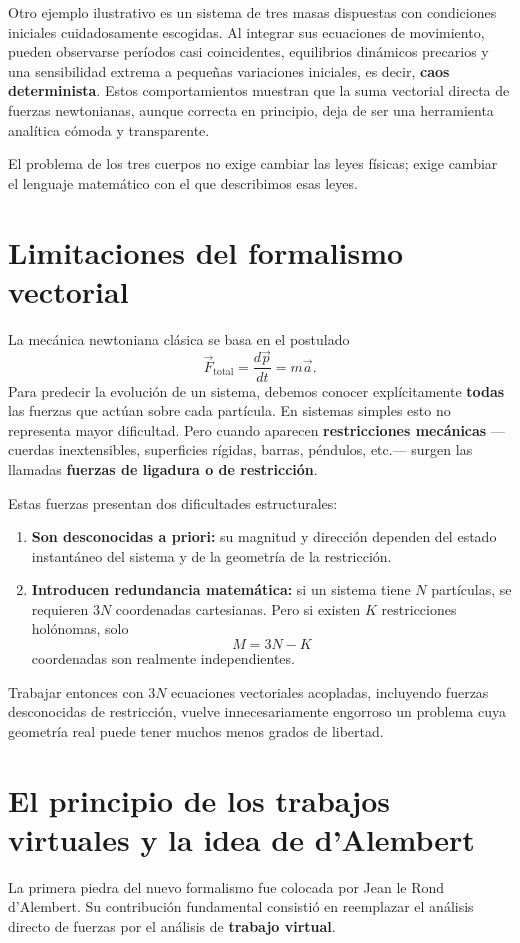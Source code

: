 Otro ejemplo ilustrativo es un sistema de tres masas dispuestas con condiciones iniciales cuidadosamente escogidas. Al integrar sus ecuaciones de movimiento, pueden observarse períodos casi coincidentes, equilibrios dinámicos precarios y una sensibilidad extrema a pequeñas variaciones iniciales, es decir, \textbf{caos determinista}. Estos comportamientos muestran que la suma vectorial directa de fuerzas newtonianas, aunque correcta en principio, deja de ser una herramienta analítica cómoda y transparente.

\begin{importante}
El problema de los tres cuerpos no exige cambiar las leyes físicas; exige cambiar el lenguaje matemático con el que describimos esas leyes.
\end{importante}

\section{Limitaciones del formalismo vectorial}
La mecánica newtoniana clásica se basa en el postulado
\[
\vec{F}_{\text{total}} = \frac{d\vec{p}}{dt} = m\vec{a}.
\]
Para predecir la evolución de un sistema, debemos conocer explícitamente \textbf{todas} las fuerzas que actúan sobre cada partícula. En sistemas simples esto no representa mayor dificultad. Pero cuando aparecen \textbf{restricciones mecánicas} —cuerdas inextensibles, superficies rígidas, barras, péndulos, etc.— surgen las llamadas \textbf{fuerzas de ligadura o de restricción}.

Estas fuerzas presentan dos dificultades estructurales:
\begin{enumerate}
    \item \textbf{Son desconocidas a priori:} su magnitud y dirección dependen del estado instantáneo del sistema y de la geometría de la restricción.
    \item \textbf{Introducen redundancia matemática:} si un sistema tiene \(N\) partículas, se requieren \(3N\) coordenadas cartesianas. Pero si existen \(K\) restricciones holónomas, solo
\[
M = 3N - K
\]
coordenadas son realmente independientes.
\end{enumerate}

Trabajar entonces con \(3N\) ecuaciones vectoriales acopladas, incluyendo fuerzas desconocidas de restricción, vuelve innecesariamente engorroso un problema cuya geometría real puede tener muchos menos grados de libertad.

\section{El principio de los trabajos virtuales y la idea de d'Alembert}
La primera piedra del nuevo formalismo fue colocada por Jean le Rond d'Alembert. Su contribución fundamental consistió en reemplazar el análisis directo de fuerzas por el análisis de \textbf{trabajo virtual}.

